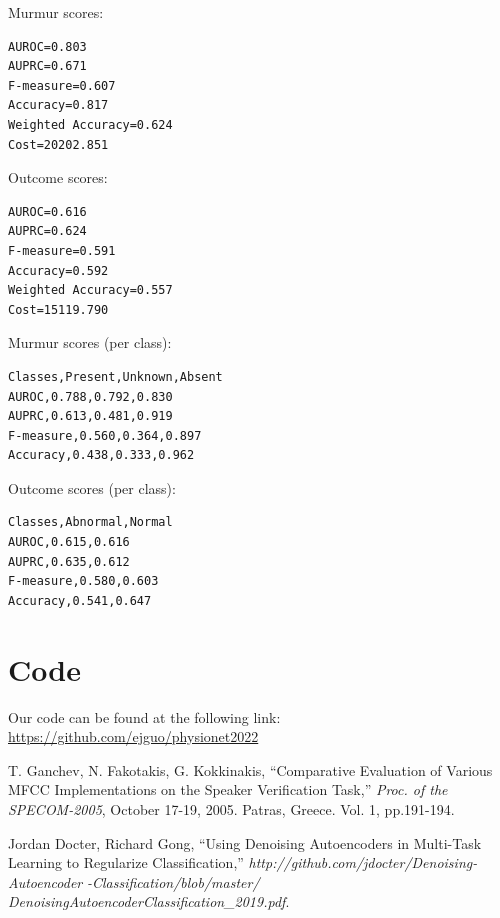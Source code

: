 \documentclass[twocolumn]{cinc}
\begin{document}
Murmur scores:
\begin{verbatim}
AUROC=0.803
AUPRC=0.671
F-measure=0.607
Accuracy=0.817
Weighted Accuracy=0.624
Cost=20202.851
\end{verbatim}


Outcome scores:
\begin{verbatim}
AUROC=0.616
AUPRC=0.624
F-measure=0.591
Accuracy=0.592
Weighted Accuracy=0.557
Cost=15119.790
\end{verbatim}

Murmur scores (per class):
\begin{verbatim}
Classes,Present,Unknown,Absent
AUROC,0.788,0.792,0.830
AUPRC,0.613,0.481,0.919
F-measure,0.560,0.364,0.897
Accuracy,0.438,0.333,0.962
\end{verbatim}


Outcome scores (per class):
\begin{verbatim}
Classes,Abnormal,Normal
AUROC,0.615,0.616
AUPRC,0.635,0.612
F-measure,0.580,0.603
Accuracy,0.541,0.647
\end{verbatim}

\section{Code}
Our code can be found at the following link: \hfill\hbox{}
\href{https://github.com/ejguo/physionet2022}{https://github.com/ejguo/physionet2022}







\begin{thebibliography}{99}{ %
 
  T. Ganchev, N. Fakotakis, G. Kokkinakis, ``Comparative Evaluation of Various MFCC Implementations on the Speaker Verification Task,'' 
 \emph{Proc. of the SPECOM-2005}, October 17-19, 2005. Patras, Greece. Vol. 1, pp.191-194.
 
 Jordan Docter, Richard Gong, ``Using Denoising Autoencoders in Multi-Task Learning to Regularize Classification,'' 
\emph{http://github.com/jdocter/Denoising-Autoencoder} 
\emph{-Classification/blob/master/}
\emph{DenoisingAutoencoderClassification\_2019.pdf}.
      
}\end{thebibliography}


\end{document}
